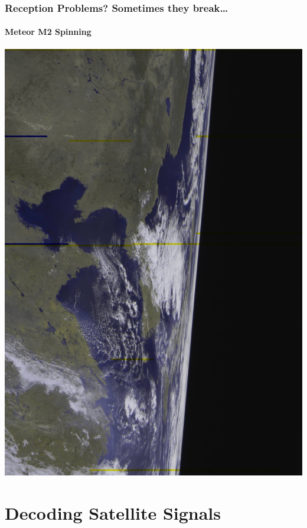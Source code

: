 \documentclass[]{beamer}
\begin{document}
\begin{frame}
    \frametitle{Reception Problems? Sometimes they break\dots}
    \framesubtitle{Meteor M2 Spinning}
    \begin{center}
        \includegraphics[width=0.75\paperwidth,height=0.75\paperheight,keepaspectratio]{images/meteor-spin.jpg}
    \end{center}
\end{frame}



\section[Decoding]{Decoding Satellite Signals}
\frame{\sectionpage}
\end{document}
